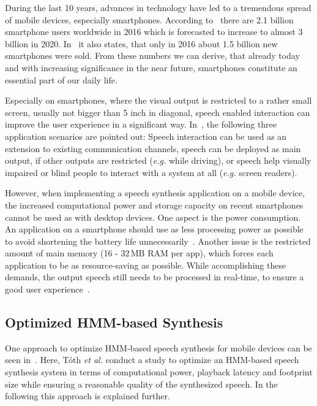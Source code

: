 During the last 10 years, advances in technology have led to a tremendous spread of mobile devices, especially smartphones. According to~\cite{statista:smartphones} there are 2.1 billion smartphone users worldwide in 2016 which is forecasted to increase to almost 3 billion in 2020. In~\cite{statista:smartphones} it also states, that only in 2016 about 1.5 billion new smartphones were sold. From these numbers we can derive, that already today and with increasing significance in the near future, smartphones constitute an essential part of our daily life.

Especially on smartphones, where the visual output is restricted to a rather small screen, usually not bigger than 5 inch in diagonal, speech enabled interaction can improve the user experience in a significant way. In~\cite{toth:optimizing}, the following three application scenarios are pointed out: Speech interaction can be used as an extension to existing communication channels, speech can be deployed as main output, if other outputs are restricted (\textit{e.g.} while driving), or speech help visually impaired or blind people to interact with a system at all (\textit{e.g.} screen readers).

However, when implementing a speech synthesis application on a mobile device, the increased computational power and storage capacity on recent smartphones cannot be used as with desktop devices. One aspect is the power consumption. An application on a smartphone should use as less processing power as possible to avoid shortening the battery life unnecessarily~\cite{toth:optimizing}. Another issue is the restricted amount of main memory (16 - 32\,MB RAM per app), which forces each application to be as resource-saving as possible. While accomplishing these demands, the output speech still needs to be processed in real-time, to ensure a good user experience~\cite{boros:robust}.

\subsection{Optimized \ac{HMM}-based Synthesis}
\label{subsec:hmmembedded}

One approach to optimize \ac{HMM}-based speech synthesis for mobile devices can be seen in~\cite{toth:optimizing}. Here, T\'oth \textit{et al.} conduct a study to optimize an \ac{HMM}-based speech synthesis system in terms of computational power, playback latency and footprint size while ensuring a reasonable quality of the synthesized speech. In the following this approach is explained further.


